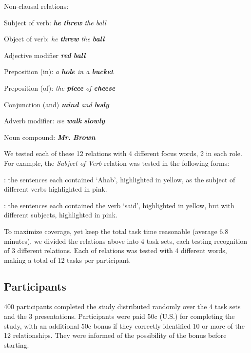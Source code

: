 Non-clausal relations:
\squishlist
	\item Subject of verb: \emph{\textbf{he} \textbf{threw} the ball}
	\item Object of verb:  \emph{ he \textbf{threw} the \textbf{ball}}
	\item Adjective modifier \emph{\textbf{red} \textbf{ball}}
	\item Preposition (in): \emph{a \textbf{hole} in a \textbf{bucket}}
	\item Preposition (of):  \emph{ the \textbf{piece} of \textbf{cheese}}
	\item Conjunction (and)  \emph{ \textbf{mind} and \textbf{body}}
	\item Adverb modifier: \emph{  we \textbf{walk} \textbf{slowly}}
	\item Noun compound:  \emph{ \textbf{Mr.}  \textbf{Brown}}
\squishend

We tested each of these 12 relations with 4 different focus words, 2 in each role. For example, the \emph{Subject of Verb} relation  was tested in the following forms:
\squishlist
	\item {}:  the sentences each contained `Ahab', highlighted in yellow, as the subject of different verbs highlighted in pink.
	\item {}

	\item {}: the sentences each contained the verb `said', highlighted in yellow, but with different subjects, highlighted in pink.
	\item {}
\squishend

To maximize coverage, yet keep the total task time reasonable (average 6.8 minutes), we divided the relations above into 4 task sets, each testing recognition of 3 different relations. Each of relations was tested with 4 different words, making a total of 12 tasks per participant.

\subsection{Participants}
400 participants completed the study distributed randomly over the 4 task sets and the 3 presentations. Participants were paid 50c (U.S.) for completing the study, with an additional 50c bonus if they correctly identified 10 or more of the 12 relationships. They were informed of the possibility of the bonus before starting.

